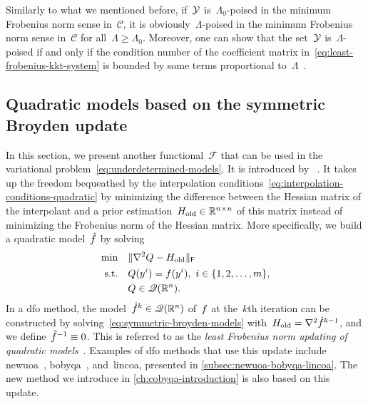 Similarly to what we mentioned before, if~$\xpt$ is~$\Lambda_0$-poised in the minimum Frobenius norm sense in~$\mathcal{C}$, it is obviously~$\Lambda$-poised in the minimum Frobenius norm sense in~$\mathcal{C}$ for all~$\Lambda \ge \Lambda_0$.
Moreover, one can show that the set~$\xpt$ is~$\Lambda$-poised if and only if the condition number of the coefficient matrix in~\cref{eq:least-frobenius-kkt-system} is bounded by some terms proportional to~$\Lambda$~\cite[Thm.~5.8]{Conn_Scheinberg_Vicente_2009b}.

\subsection{Quadratic models based on the symmetric Broyden update}
\label{subsec:symmetric-broyden-updates}

In this section, we present another functional~$\mathcal{F}$ that can be used in the variational problem~\cref{eq:underdetermined-models}.
It is introduced by \citeauthor{Powell_2004b}~\cite{Powell_2004b}.
It takes up the freedom bequeathed by the interpolation conditions~\cref{eq:interpolation-conditions-quadratic} by minimizing the difference between the Hessian matrix of the interpolant and a prior estimation~$H_{\text{old}} \in \mathbb{R}^{n \times n}$ of this matrix instead of minimizing the Frobenius norm of the Hessian matrix.
More specifically, we build a quadratic model~$\objm$ by solving
\begin{subequations}
    \label{eq:symmetric-broyden-models}
    \begin{align}
        \min        & \quad \lVert\nabla^2 Q - H_{\text{old}}\rVert_{\mathsf{F}}\\
        \text{s.t.} & \quad Q(y^i) = f(y^i), ~ i \in \{1, 2, \dots, m\},\\
                    & \quad Q \in \mathscr{Q}(\mathbb{R}^n).
    \end{align}
\end{subequations}
In a \gls{dfo} method, the model~$\objm[k] \in \qpoly$ of~$f$ at the~$k$th iteration can be constructed by solving~\cref{eq:symmetric-broyden-models} with~$H_{\text{old}} = \nabla^2 \objm[k - 1]$, and we define~$\objm[-1] \equiv 0$.
This is referred to as the \emph{least Frobenius norm updating of quadratic models}~\cite{Powell_2004b}.
Examples of \gls{dfo} methods that use this update include \gls{newuoa}~\cite{Powell_2006}, \gls{bobyqa}~\cite{Powell_2009}, and~\gls{lincoa}, presented in \cref{subsec:newuoa-bobyqa-lincoa}.
The new method we introduce in \cref{ch:cobyqa-introduction} is also based on this update.


